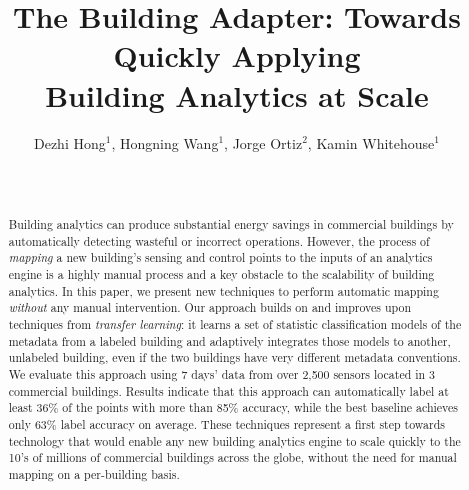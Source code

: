 \documentclass{sig-alternate-2013}
\begin{document}
\title{The Building Adapter: Towards Quickly Applying\\ Building Analytics at Scale}

\author{
\alignauthor
Dezhi Hong$^1$,  Hongning Wang$^1$, Jorge Ortiz$^2$, Kamin Whitehouse$^1$\\
	\\
	\\
}

\maketitle \begin{abstract} 
Building analytics can produce substantial energy
savings in commercial buildings by automatically detecting wasteful or incorrect
operations.  However, the process of {\em mapping} a new building's sensing and
control points to the inputs of an analytics engine is a highly manual process
and a key obstacle to the scalability of building analytics. In this paper, we
present new techniques to perform automatic mapping {\em without} any manual
intervention. Our approach builds on and improves upon techniques from {\em
transfer learning}: it learns a set of statistic classification models of the
metadata from a labeled building and adaptively integrates those models to
another, unlabeled building, even if the two buildings have very different
metadata conventions. We evaluate this approach using 7 days' data from over
2,500 sensors located in 3 commercial buildings. Results indicate that this
approach can automatically label at least 36\% of the points with more than 85\%
accuracy, while the best baseline achieves only 63\% label accuracy on average.
These techniques represent a first step towards technology that would enable any
new building analytics engine to scale quickly to the 10's of millions of
commercial buildings across the globe, without the need for manual mapping on a
per-building basis. 
\end{abstract}

\end{document}
